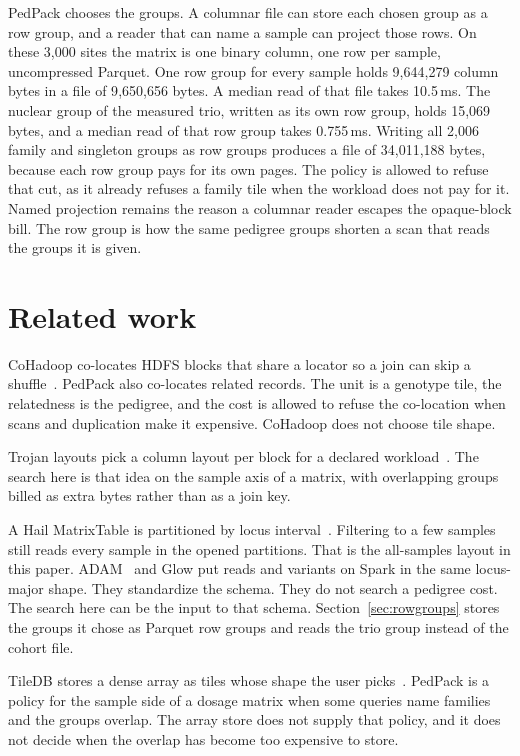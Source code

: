 \documentclass[11pt]{article}
\begin{document}
PedPack chooses the groups.
A columnar file can store each chosen group as a row group, and a reader that can name a sample can project those rows.
On these 3{,}000 sites the matrix is one binary column, one row per sample, uncompressed Parquet.
One row group for every sample holds 9{,}644{,}279 column bytes in a file of 9{,}650{,}656 bytes.
A median read of that file takes 10.5\,ms.
The nuclear group of the measured trio, written as its own row group, holds 15{,}069 bytes, and a median read of that row group takes 0.755\,ms.
Writing all 2{,}006 family and singleton groups as row groups produces a file of 34{,}011{,}188 bytes, because each row group pays for its own pages.
The policy is allowed to refuse that cut, as it already refuses a family tile when the workload does not pay for it.
Named projection remains the reason a columnar reader escapes the opaque-block bill.
The row group is how the same pedigree groups shorten a scan that reads the groups it is given.

\section{Related work}
\label{sec:related}

CoHadoop co-locates HDFS blocks that share a locator so a join can skip a shuffle~\cite{eltabakh2011cohadoop}.
PedPack also co-locates related records.
The unit is a genotype tile, the relatedness is the pedigree, and the cost is allowed to refuse the co-location when scans and duplication make it expensive.
CoHadoop does not choose tile shape.

Trojan layouts pick a column layout per block for a declared workload~\cite{jindal2011trojan}.
The search here is that idea on the sample axis of a matrix, with overlapping groups billed as extra bytes rather than as a join key.

A Hail MatrixTable is partitioned by locus interval~\cite{hail}.
Filtering to a few samples still reads every sample in the opened partitions.
That is the all-samples layout in this paper.
ADAM~\cite{massie2013adam} and Glow put reads and variants on Spark in the same locus-major shape.
They standardize the schema.
They do not search a pedigree cost.
The search here can be the input to that schema.
Section~\ref{sec:rowgroups} stores the groups it chose as Parquet row groups and reads the trio group instead of the cohort file.

TileDB stores a dense array as tiles whose shape the user picks~\cite{papadopoulos2016tiledb}.
PedPack is a policy for the sample side of a dosage matrix when some queries name families and the groups overlap.
The array store does not supply that policy, and it does not decide when the overlap has become too expensive to store.
\end{document}
